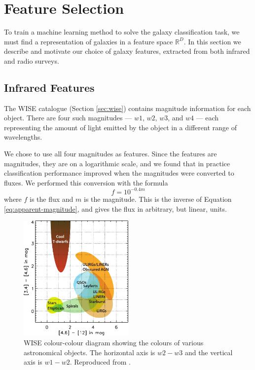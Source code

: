 
\section{Feature Selection}
\label{sec:features}

  To train a machine learning method to solve the galaxy classification task,
  we must find a representation of galaxies in a feature space $\mathbb{R}^D$.
  In this section we describe and motivate our choice of galaxy features,
  extracted from both infrared and radio surveys.

  \subsection{Infrared Features}
  \label{sec:ir-features}

    The WISE catalogue (Section \ref{sec:wise}) contains magnitude information
    for each object. There are four such magnitudes --- $w1$, $w2$, $w3$, and $w4$ ---
    each representing the amount of light emitted by the object in a different
    range of wavelengths.

    We chose to use all four magnitudes as features. Since the features are
    magnitudes, they are on a logarithmic scale, and we found that in practice
    classification performance improved when the magnitudes were converted to
    fluxes. We performed this conversion with the formula
    \[
      f = 10^{-0.4m}
    \]
    where $f$ is the flux and $m$ is the magnitude. This is the inverse of
    Equation \ref{eq:apparent-magnitude}, and gives the flux in arbitrary, but
    linear, units.

    \begin{figure}[!ht]
      \centering
      \includegraphics[width=0.5\textwidth]{images/wise_colour-colour}
      \caption{WISE colour-colour diagram showing the colours of various
        astronomical objects. The horizontal axis is $w2 - w3$ and the vertical
        axis is $w1 - w2$. Reproduced from \citep{wright10}.}
      \label{fig:wise-colour-colour}
    \end{figure}

